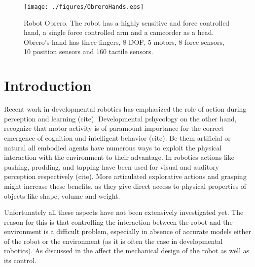 \begin{figure}[tbp]
\centerline{
\texttt{[image: ./figures/ObreroHands.eps]}
} \caption{Robot Obrero. The robot has a highly sensitive and
force controlled hand, a single force controlled arm and a
camcorder as a head. Obrero's hand  has three fingers, 8 DOF, 5
motors, 8 force sensors, 10 position sensors and 160 tactile
sensors.} \label{fig:RobotObrero}
\end{figure}

\section{Introduction}

Recent work in developmental robotics has emphasized the role of action
during perception and learning (cite). Developmental pshycology on the 
other hand, recognize that motor activity is of paramount importance 
for the correct emergence of cognition and intelligent behavior (cite). 
Be them artificial or natural all embodied agents have numerous ways 
to exploit the physical interaction with the environment to their advantage. 
In robotics actions like pushing, prodding, and tapping have been used for 
visual and auditory perception respectively (cite). 
More articulated explorative actions and grasping might increase these benefits, 
as they give direct access to physical properties of objects like shape, volume
and weight.


Unfortunately all these aspects have not been extensively investigated yet. The 
reason for this is that controlling the interaction between the robot and 
the environment is a difficult problem, especially in absence of accurate 
models either of the robot or the environment (as it is often the case in 
developmental robotics). As discussed in \cite{volpe90real} the 
 affect the mechanical design of the robot as well as
its control.

